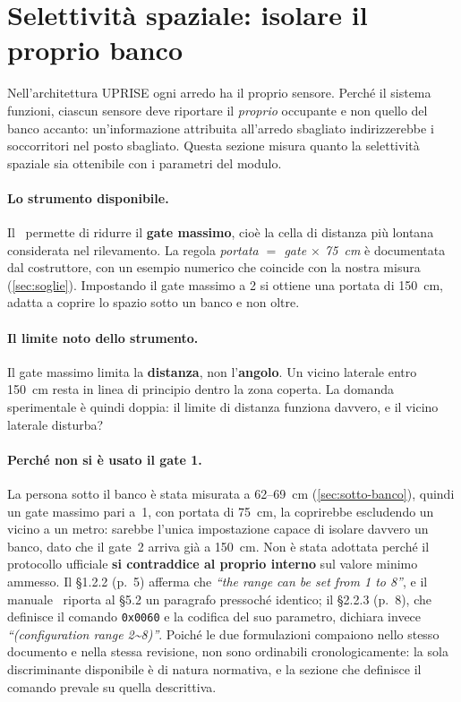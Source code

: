 \section{Selettività spaziale: isolare il proprio banco}
\label{sec:selettivita}

Nell'architettura UPRISE ogni arredo ha il proprio sensore. Perché il sistema
funzioni, ciascun sensore deve riportare il \emph{proprio} occupante e non quello del
banco accanto: un'informazione attribuita all'arredo sbagliato indirizzerebbe i
soccorritori nel posto sbagliato. Questa sezione misura quanto la selettività
spaziale sia ottenibile con i parametri del modulo.

\paragraph{Lo strumento disponibile.} Il \ldb\ permette di ridurre il
\textbf{gate massimo}, cioè la cella di distanza più lontana considerata nel
rilevamento. La regola \emph{portata $=$ gate $\times$ 75~cm} è documentata dal
costruttore, con un esempio numerico che coincide con la nostra misura
(\cref{sec:soglie}). Impostando il gate massimo a 2 si ottiene una portata di 150~cm,
adatta a coprire lo spazio sotto un banco e non oltre.

\paragraph{Il limite noto dello strumento.} Il gate massimo limita la
\textbf{distanza}, non l'\textbf{angolo}. Un vicino laterale entro 150~cm resta in
linea di principio dentro la zona coperta. La domanda sperimentale è quindi doppia:
il limite di distanza funziona davvero, e il vicino laterale disturba?

\paragraph{Perché non si è usato il gate 1.} La persona sotto il banco è stata
misurata a 62--69~cm (\cref{sec:sotto-banco}), quindi un gate massimo pari a~1, con
portata di 75~cm, la coprirebbe escludendo un vicino a un metro: sarebbe l'unica
impostazione capace di isolare davvero un banco, dato che il gate~2 arriva già a
150~cm. Non è stata adottata perché il protocollo ufficiale \textbf{si contraddice
al proprio interno} sul valore minimo ammesso. Il \S1.2.2 (p.~5) afferma che
\emph{``the range can be set from 1 to 8''}, e il manuale~\cite{hilinkManualV104}
riporta al \S5.2 un paragrafo pressoché identico; il \S2.2.3 (p.~8), che definisce
il comando \texttt{0x0060} e la codifica del suo parametro, dichiara invece
\emph{``(configuration range 2\textasciitilde8)''}. Poiché le due formulazioni
compaiono nello stesso documento e nella stessa revisione, non sono ordinabili
cronologicamente: la sola discriminante disponibile è di natura normativa, e la
sezione che definisce il comando prevale su quella descrittiva.


